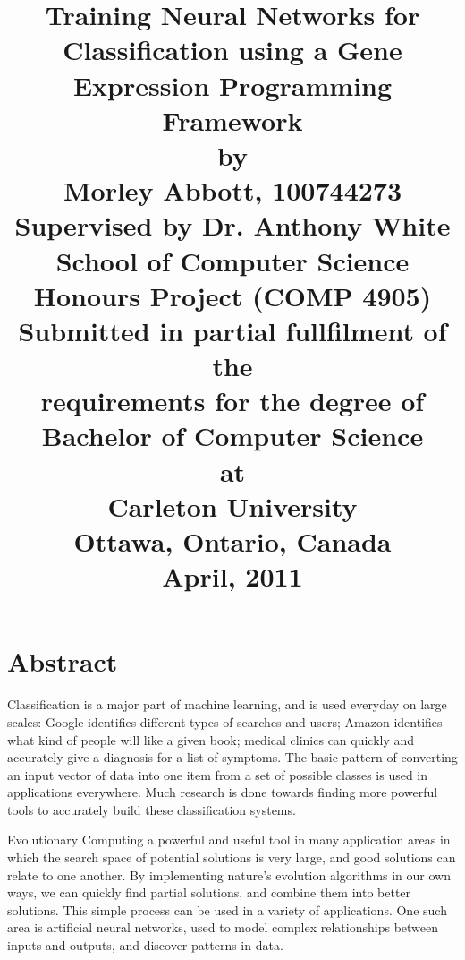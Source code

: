 \documentclass[a4paper,11pt]{report}
\begin{document}
\title{
\huge{\textbf{Training Neural Networks for Classification using a Gene Expression Programming Framework}}\\[1.4cm]
\large{by}\\[0.2cm]
\large{Morley Abbott, 100744273} \\[1.4cm]
\large{Supervised by Dr. Anthony White} \\[0.2cm]
\large{School of Computer Science}\\[1.4cm]
\large{Honours Project (COMP 4905)} \\[0.2cm]
\large{Submitted in partial fullfilment of the} \\[0.2cm]
\large{requirements for the degree of } \\[0.2cm]
\large{Bachelor of Computer Science} \\[1.4cm]
\large{at}\\[1.4cm]
\large{Carleton University} \\[0.2cm]
\large{Ottawa, Ontario, Canada} \\[0.2cm]
\large{April, 2011} \\[0.2cm]}
\author{} \date{}

\maketitle


\chapter*{Abstract}

Classification is a major part of machine learning, and is used everyday on large scales:
Google identifies different types of searches and users; Amazon identifies
what kind of people will like a given book; medical clinics can quickly and accurately 
give a diagnosis for a list of symptoms. The basic pattern of converting an input vector 
of data into one item from a set of possible classes is used in applications everywhere. 
Much research is done towards finding more powerful tools to accurately build these classification 
systems.

Evolutionary Computing a powerful and useful tool in many application 
areas in which the search space of potential solutions is very large, and good solutions
can relate to one another. By implementing nature's evolution algorithms in our own ways, we can quickly 
find partial solutions, and combine them into better solutions. This simple process can be 
used in a variety of applications. One such area is artificial neural networks, used to model complex
relationships between inputs and outputs, and discover patterns in data.
\end{document}
